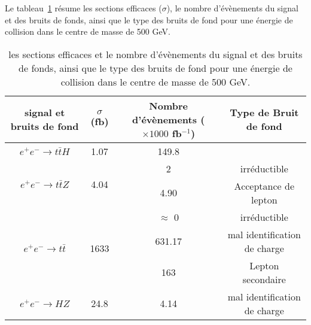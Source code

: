  Le tableau~\ref{table:3.2}  r\'esume les sections efficaces ($\sigma$), le nombre d'\'ev\`enements du signal et des bruits de fonds, ainsi que le type des bruits de fond pour une \'energie de collision dans le centre de masse de 500 GeV.
\begin{table}[H]
\centering
\begin{tabular}{|c|c|c|c|} \hline
  signal et bruits de fond & $\sigma$(fb) & Nombre d'\'ev\`enements ($\times 1000 $ fb$^{-1}$)  &  Type de Bruit de fond\\ \hline
  $e^+e^-{\rightarrow}t\bar{t}H$ & 1.07 & 149.8 &  \\ \hline
  \multirow{2}{*}{$e^+e^-{\rightarrow}t\bar{t}Z$} & \multirow{2}{*}{4.04} & \multirow{-1}{*}{2} & \multirow{-1}{*}{irréductible} \\ \cline{3-4}
  &  & 4.90 & Acceptance de lepton \\ \hline
  \multirow{3}{*}{$e^+e^-{\rightarrow}t\bar{t}$} & \multirow{3}{*}{1633} & \multirow{-1}{*}{$\approx$ 0} &  \multirow{-1}{*}{irréductible} \\ \cline{3-4}
  &  & 631.17 & mal identification de charge  \\ \cline{3-4}
  &  & 163 & Lepton secondaire  \\ \hline
  $e^+e^-{\rightarrow}HZ$ & 24.8 & 4.14 & mal identification de charge \\\hline
\end{tabular}
\caption{les sections efficaces et le nombre d'\'ev\`enements du signal et des bruits de fonds, ainsi que le type des bruits de fond pour une \'energie de collision dans le centre de masse de 500 GeV.}
\label{table:3.2}
\end{table}